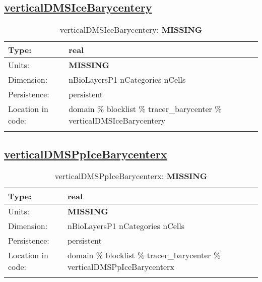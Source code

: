\subsection[verticalDMSIceBarycentery]{\hyperref[sec:var_tab_tracer_barycenter]{verticalDMSIceBarycentery}}
\label{subsec:var_sec_tracer_barycenter_verticalDMSIceBarycentery}
\begin{center}
\begin{longtable}{| p{2.0in} | p{4.0in} |}
        \hline 
        Type: & real \\
        \hline 
        Units: & {\bf \color{red} MISSING} \\
        \hline 
        Dimension: & nBioLayersP1 nCategories nCells \\
        \hline 
        Persistence: & persistent \\
        \hline 
         Location in code: & domain \% blocklist \% tracer\_barycenter \% verticalDMSIceBarycentery \\
         \hline 
    \caption{verticalDMSIceBarycentery: {\bf \color{red} MISSING}}
\end{longtable}
\end{center}
\subsection[verticalDMSPpIceBarycenterx]{\hyperref[sec:var_tab_tracer_barycenter]{verticalDMSPpIceBarycenterx}}
\label{subsec:var_sec_tracer_barycenter_verticalDMSPpIceBarycenterx}
\begin{center}
\begin{longtable}{| p{2.0in} | p{4.0in} |}
        \hline 
        Type: & real \\
        \hline 
        Units: & {\bf \color{red} MISSING} \\
        \hline 
        Dimension: & nBioLayersP1 nCategories nCells \\
        \hline 
        Persistence: & persistent \\
        \hline 
         Location in code: & domain \% blocklist \% tracer\_barycenter \% verticalDMSPpIceBarycenterx \\
         \hline 
    \caption{verticalDMSPpIceBarycenterx: {\bf \color{red} MISSING}}
\end{longtable}
\end{center}
